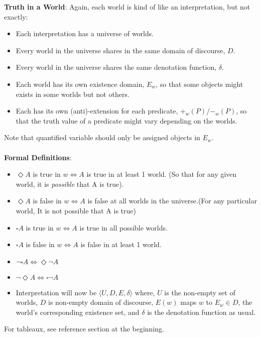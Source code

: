 \documentclass{article}
\begin{document}
\noindent \textbf{Truth in a World}: Again, each world is kind of like an interpretation, but not exactly:

\begin{itemize}
    \item Each interpretation has a universe of worlds.
    \item Every world in the universe shares in the same domain of discourse, $D$.
    \item Every world in the universe shares the same denotation function, $\delta$.
    \item Each world has its own existence domain, $E_w$, so that some objects might exists in some worlds but not others.
    \item Each has its own (anti)-extension for each predicate, $+_w(P)/-_w(P)$, so that the truth value of a predicate might vary depending on the worlds. 
\end{itemize}
Note that quantified variable should only be assigned objects in $E_w$.\\\\

\noindent \textbf{Formal Definitions}: 
\begin{itemize}
    \item $\Diamond A$ is true in $w \iff A$ is true in at least 1 world. (So that for any given world, it is \emph{possible} that A is true).
    \item $\Diamond A$ is false in $w \iff A$ is false at all worlds in the universe.(For any particular world, It is not possible that A is true)  \\
    \item $\square A$ is true in $w \iff A$ is true in all possible worlds.
    \item  $\square A$ is false in $w \iff A$ is false in at least 1 world.\\
    \item $\lnot \square A \iff \Diamond \lnot A$
    \item $\lnot \Diamond A \iff \square \lnot A$\\
    \item {Interpretation will now be $\langle U, D, E, \delta \rangle$ where, $U$ is the non-empty set of worlds, $D$ is non-empty domain of discourse,
        $E(w)$ maps $w$ to $E_w \in D$, the world's corresponding existence set, and $\delta$ is the denotation function as usual.
    }
    
\end{itemize}


For tableaux, see reference section at the beginning.
\end{document}
